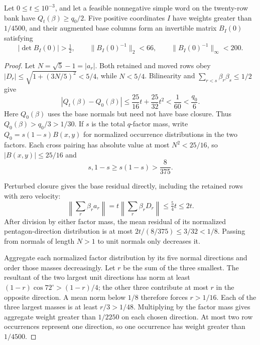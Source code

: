 \begin{lemma}
\label{lem:he-pivot}
Let $0\leq t\leq10^{-3}$, and let a feasible nonnegative simple word on the
twenty-row bank have $Q_t(\beta)\geq q_0/2$. Five positive coordinates
$I$ have weights greater than $1/4500$, and their augmented base columns
form an invertible matrix $B_I(0)$ satisfying
\[
 |\det B_I(0)|>\tfrac12,\qquad
 \|B_I(0)^{-1}\|_2<66,\qquad
 \|B_I(0)^{-1}\|_\infty<200.
\]
\end{lemma}

\begin{proof}
Let $N=\sqrt5-1=|a_r|$. Both retained and moved rows obey
$|D_r|\leq\sqrt{1+(3N/5)^2}<5/4$, while $N<5/4$.
Bilinearity and $\sum_{r<s}\beta_r\beta_s\leq1/2$ give
\[
 |Q_t(\beta)-Q_0(\beta)|
 \leq\frac{25}{16}t+\frac{25}{32}t^2
 <\frac1{60}<\frac{q_0}{6}.
\]
Here $Q_0(\beta)$ uses the base normals but need not have base closure.
Thus $Q_0(\beta)>q_0/3>1/30$. If $s$ is the total $q$-factor mass,
write $Q_0=s(1-s)B(x,y)$ for normalized occurrence distributions in
the two factors. Each cross pairing has absolute value at most
$N^2<25/16$, so $|B(x,y)|\leq25/16$ and
\[
 s,1-s\geq s(1-s)>\frac8{375}.
\]

Perturbed closure gives the base residual directly, including the
retained rows with zero velocity:
\[
 \left\|\sum_r\beta_ra_r\right\|
 =t\left\|\sum_r\beta_rD_r\right\|
\leq\tfrac54t\leq2t.
\]
After division by either factor mass, the mean residual of its
normalized pentagon-direction distribution is at most
$2t/(8/375)\leq3/32<1/8$. Passing from normals of length $N>1$
to unit normals only decreases it.

Aggregate each normalized factor distribution by its five normal
directions and order those masses decreasingly. Let $r$ be the sum of
the three smallest. The resultant of the two largest unit directions
has norm at least $(1-r)\cos72^\circ>(1-r)/4$; the other three
contribute at most $r$ in the opposite direction. A mean norm below
$1/8$ therefore forces $r>1/16$. Each of the three largest masses is
at least $r/3>1/48$. Multiplying by the factor mass gives aggregate
weight greater than $1/2250$ on each chosen direction. At most two row
occurrences represent one direction, so one occurrence has weight
greater than $1/4500$.


\end{proof}

